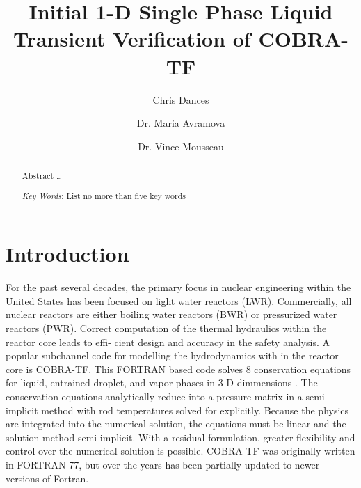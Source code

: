 \documentclass{mc2015}
\begin{document}
\title{Initial 1-D Single Phase Liquid Transient Verification of COBRA-TF}

\author{Chris Dances}
\author{Dr. Maria Avramova}

\author{Dr. Vince Mousseau}

\maketitle

\begin{abstract}
Abstract \ldots

\emph{Key Words}: List no more than five key words
\end{abstract}

\clearpage

%

\section{Introduction}

For the past several decades, the primary focus in nuclear engineering within
the United States has been focused on light water reactors (LWR). Commercially,
all nuclear reactors are either boiling water reactors (BWR) or pressurized
water reactors (PWR). Correct computation of the thermal hydraulics within the
reactor core leads to effi- cient design and accuracy in the safety analysis. A
popular subchannel code for modelling the hydrodynamics with in the reactor core
is COBRA-TF. This FORTRAN based code solves 8 conservation equations for liquid,
entrained droplet, and vapor phases in 3-D dimmensions \cite{CTF_Theory}. The
conservation equations analytically reduce into a pressure matrix in a 
semi-implicit  method with rod temperatures solved for explicitly. Because the 
physics are integrated into the numerical solution, the equations  must be
linear and the solution method semi-implicit. With a residual formulation,
greater flexibility and control over the numerical solution is possible.
COBRA-TF was originally written in FORTRAN 77, but over the years has been
partially updated to newer versions of Fortran.
\end{document}
